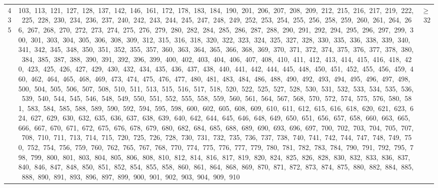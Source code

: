 \begin{longtable}{c|p{}|r}
435 & 103,\ 113,\ 121,\ 127,\ 128,\ 137,\ 142,\ 146,\ 161,\ 172,\ 178,\ 183,\ 184,\ 190,\ 201,\ 206,\ 207,\ 208,\ 209,\ 212,\ 215,\ 216,\ 217,\ 219,\ 222,\ 225,\ 228,\ 230,\ 234,\ 236,\ 237,\ 240,\ 242,\ 243,\ 244,\ 245,\ 247,\ 248,\ 249,\ 252,\ 253,\ 254,\ 255,\ 256,\ 258,\ 259,\ 260,\ 261,\ 264,\ 266,\ 267,\ 268,\ 270,\ 272,\ 273,\ 274,\ 275,\ 276,\ 279,\ 280,\ 282,\ 284,\ 285,\ 286,\ 287,\ 288,\ 290,\ 291,\ 292,\ 294,\ 295,\ 296,\ 297,\ 299,\ 300,\ 301,\ 303,\ 304,\ 305,\ 306,\ 308,\ 309,\ 312,\ 315,\ 316,\ 318,\ 320,\ 322,\ 323,\ 324,\ 325,\ 327,\ 328,\ 330,\ 335,\ 336,\ 338,\ 339,\ 340,\ 341,\ 342,\ 345,\ 348,\ 350,\ 351,\ 352,\ 355,\ 357,\ 360,\ 363,\ 364,\ 365,\ 366,\ 368,\ 369,\ 370,\ 371,\ 372,\ 374,\ 375,\ 376,\ 377,\ 378,\ 380,\ 384,\ 385,\ 387,\ 388,\ 390,\ 391,\ 392,\ 396,\ 399,\ 400,\ 402,\ 403,\ 404,\ 406,\ 407,\ 408,\ 410,\ 411,\ 412,\ 413,\ 414,\ 415,\ 416,\ 418,\ 420,\ 423,\ 425,\ 426,\ 427,\ 429,\ 430,\ 432,\ 434,\ 435,\ 436,\ 437,\ 438,\ 440,\ 441,\ 442,\ 444,\ 445,\ 448,\ 450,\ 451,\ 452,\ 455,\ 456,\ 459,\ 460,\ 462,\ 464,\ 465,\ 468,\ 469,\ 473,\ 474,\ 475,\ 476,\ 477,\ 480,\ 481,\ 483,\ 484,\ 486,\ 488,\ 490,\ 492,\ 493,\ 494,\ 495,\ 496,\ 497,\ 498,\ 500,\ 504,\ 505,\ 506,\ 507,\ 508,\ 510,\ 511,\ 513,\ 515,\ 516,\ 517,\ 518,\ 520,\ 522,\ 525,\ 527,\ 528,\ 530,\ 531,\ 532,\ 533,\ 534,\ 535,\ 536,\ 539,\ 540,\ 544,\ 545,\ 546,\ 548,\ 549,\ 550,\ 551,\ 552,\ 555,\ 558,\ 559,\ 560,\ 561,\ 564,\ 567,\ 568,\ 570,\ 572,\ 574,\ 575,\ 576,\ 580,\ 581,\ 583,\ 584,\ 585,\ 588,\ 589,\ 590,\ 592,\ 594,\ 595,\ 598,\ 600,\ 602,\ 605,\ 608,\ 609,\ 610,\ 611,\ 612,\ 615,\ 616,\ 618,\ 620,\ 621,\ 623,\ 624,\ 627,\ 629,\ 630,\ 632,\ 635,\ 636,\ 637,\ 638,\ 639,\ 640,\ 642,\ 644,\ 645,\ 646,\ 648,\ 649,\ 650,\ 651,\ 656,\ 657,\ 658,\ 660,\ 663,\ 665,\ 666,\ 667,\ 670,\ 671,\ 672,\ 675,\ 676,\ 678,\ 679,\ 680,\ 682,\ 684,\ 685,\ 688,\ 689,\ 690,\ 693,\ 696,\ 697,\ 700,\ 702,\ 703,\ 704,\ 705,\ 707,\ 708,\ 710,\ 711,\ 713,\ 714,\ 715,\ 720,\ 725,\ 726,\ 728,\ 730,\ 731,\ 732,\ 735,\ 736,\ 737,\ 738,\ 740,\ 741,\ 742,\ 744,\ 747,\ 748,\ 749,\ 750,\ 752,\ 754,\ 756,\ 759,\ 760,\ 762,\ 765,\ 767,\ 768,\ 770,\ 774,\ 775,\ 776,\ 777,\ 779,\ 780,\ 781,\ 782,\ 783,\ 784,\ 790,\ 791,\ 792,\ 795,\ 798,\ 799,\ 800,\ 801,\ 803,\ 804,\ 805,\ 806,\ 808,\ 810,\ 812,\ 814,\ 816,\ 817,\ 819,\ 820,\ 824,\ 825,\ 826,\ 828,\ 830,\ 832,\ 833,\ 836,\ 837,\ 840,\ 846,\ 847,\ 848,\ 850,\ 851,\ 852,\ 854,\ 855,\ 858,\ 860,\ 861,\ 864,\ 868,\ 869,\ 870,\ 871,\ 872,\ 873,\ 874,\ 875,\ 880,\ 882,\ 884,\ 885,\ 888,\ 890,\ 891,\ 893,\ 896,\ 897,\ 899,\ 900,\ 901,\ 902,\ 903,\ 904,\ 909,\ 910 & $\ge$ 32 \\

\end{longtable}
